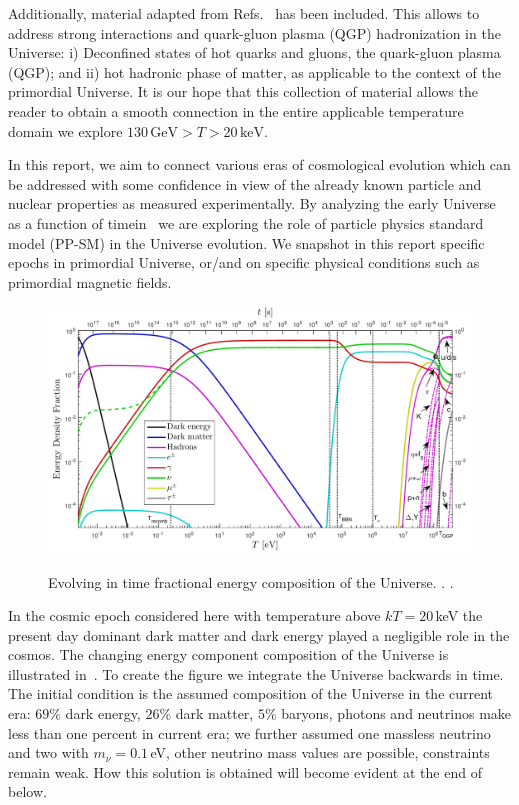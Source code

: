 Additionally, material adapted from Refs.~\cite{Letessier:2002ony,Rafelski:2015cxa,Rafelski:2016hnq,Rafelski:2019twp} has been included. This allows to address strong interactions and quark-gluon plasma (QGP) hadronization in the Universe: i) Deconfined states of hot quarks and gluons, the quark-gluon plasma (QGP); and ii) hot hadronic phase of matter, as applicable to the context of the primordial Universe. It is our hope that this collection of material allows the reader to obtain a smooth connection in the entire applicable temperature domain we explore $130\,\mathrm{GeV}>T>20\,\mathrm{keV}$.

In this report, we aim to connect various eras of cosmological evolution which can be addressed with some confidence in view of the already known particle and nuclear properties as measured experimentally. By analyzing the early Universe as a function of timein~ we are exploring the role of particle physics standard model (PP-SM) in the Universe evolution. We snapshot in this report specific epochs in primordial Universe, or/and on specific physical conditions such as primordial magnetic fields.

\begin{figure}
\vspace*{0.62\textwidth}\includegraphics[width=\textwidth]{01-introduction/Figures/energyFractions.pdf}\label{fig:energy:frac}
\caption{Evolving in time fractional energy composition of the Universe. . .}
 \end{figure}

In the cosmic epoch considered here with temperature above $kT=20$\,keV the present day dominant dark matter and dark energy played a negligible role in the cosmos. The changing energy component composition of the Universe is illustrated in~. To create the figure we integrate the Universe backwards in time. The initial condition is the assumed composition of the Universe in the current era: $69\%$ dark energy, $26\%$ dark matter, $5\%$ baryons, photons and neutrinos make less than one percent in current era; we further assumed one massless neutrino and two with $m_\nu=0.1$\,eV, other neutrino mass values are possible, constraints remain weak. How this solution is obtained will become evident at the end of  below. 

